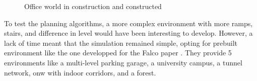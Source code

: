 \documentclass[12pt]{article}
\begin{document}
    \begin{figure}[H]
        \centering
        \caption{Office world in construction and constructed}
        \label{fig:office_world}
    \end{figure}

    To test the planning algorithms, a more complex environment with more ramps, stairs, and difference in level would have been interesting to develop. However, a lack of time meant that the simulation remained simple, opting for prebuilt environment like the one developped for the Falco paper \cite{zhang2020falco}. They provide 5 environments like a multi-level parking garage, a university campus, a tunnel network, onw with indoor corridors, and a forest. 
    
\end{document}
